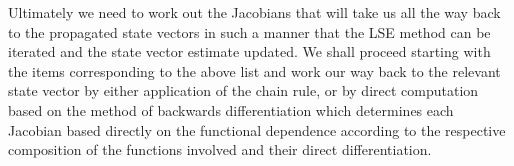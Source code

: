 Ultimately we need to work out the Jacobians that will take us all the way back to the propagated state vectors in such a manner that the LSE method can be iterated and the state vector estimate updated. We shall proceed starting with the items corresponding to the above list and work our way back to the relevant state vector by either application of the chain rule, or by direct computation based on the method of backwards differentiation which determines each Jacobian based directly on the functional dependence according to the respective composition of the functions involved and their direct differentiation.